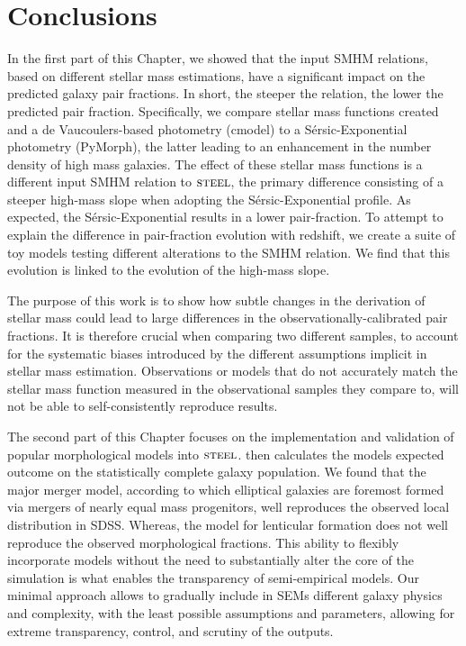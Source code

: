 \section{Conclusions}
\label{sec:Conclusions}

In the first part of this Chapter, we showed that the input SMHM relations, based on different stellar mass estimations, have a significant impact on the predicted galaxy pair fractions. In short, the steeper the relation, the lower the predicted pair fraction. Specifically, we compare stellar mass functions created and a de Vaucoulers-based photometry (cmodel) to a S\'ersic-Exponential photometry (PyMorph), the latter leading to an enhancement in the number density of high mass galaxies. The effect of these stellar mass functions is a different input SMHM relation to $\textsc{steel}$, the primary difference consisting of a steeper high-mass slope when adopting the S\'ersic-Exponential profile. As expected, the S\'ersic-Exponential results in a lower pair-fraction. To attempt to explain the difference in pair-fraction evolution with redshift, we create a suite of toy models testing different alterations to the SMHM relation. We find that this evolution is linked to the evolution of the high-mass slope.

The purpose of this work is to show how subtle changes in the derivation of stellar mass could lead to large differences in the observationally-calibrated pair fractions. It is therefore crucial when comparing two different samples, to account for the systematic biases introduced by the different assumptions implicit in stellar mass estimation. Observations or models that do not accurately match the stellar mass function measured in the observational samples they compare to, will not be able to self-consistently reproduce results.

The second part of this Chapter focuses on the implementation and validation of popular morphological models into $\textsc{steel}$. \steel then calculates the models expected outcome on the statistically complete galaxy population. We found that the major merger model, according to which elliptical galaxies are foremost formed via mergers of nearly equal mass progenitors, well reproduces the observed local distribution in SDSS. Whereas, the \citet{Cook2009Two-phaseFormation} model for lenticular formation does not well reproduce the observed morphological fractions. This ability to flexibly incorporate models without the need to substantially alter the core of the simulation is what enables the transparency of semi-empirical models. Our minimal approach allows to gradually include in SEMs different galaxy physics and complexity, with the least possible assumptions and parameters, allowing for extreme transparency, control, and scrutiny of the outputs.

